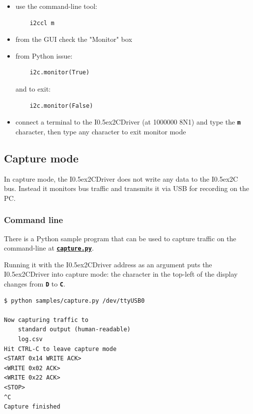 \documentclass{article}
\newcommand{\two}{\raise0.5ex\hbox{\footnotesize{2}}}
\newcommand{\iic}{I\two{}C}
\newcommand{\iicdriver}{I\two{}CDriver}
\newcommand{\mach}[1]{\texttt{\textbf{#1}}}
\begin{document}
\begin{itemize}
\item use the command-line tool:

\begin{lstlisting}
    i2ccl m
\end{lstlisting}

\item from the GUI check the "Monitor" box
\item from Python issue:

\begin{lstlisting}
    i2c.monitor(True)
\end{lstlisting}
  
and to exit:

\begin{lstlisting}
    i2c.monitor(False)
\end{lstlisting}

\item connect a terminal to the \iicdriver{} (at 1000000 8N1) and type the \mach{m} character, then type any character to exit monitor mode
\end{itemize}

\subsection{Capture mode}

In capture mode, the \iicdriver{} does not write any data to the \iic{} bus.
Instead it monitors bus traffic and transmits it via USB for recording on the PC.

\subsubsection{Command line}\index{capture.py@\mach{capture.py}}

There is a Python sample program that can be used to capture traffic on the command-line at
\href{https://github.com/jamesbowman/i2cdriver/blob/master/python/samples/capture.py}{\mach{capture.py}}.

Running it with the \iicdriver{} address as an argument puts the \iicdriver{} into capture mode:
the character in the top-left of the display changes from \mach{D} to \mach{C}.

\begin{lstlisting}
$ python samples/capture.py /dev/ttyUSB0

Now capturing traffic to
    standard output (human-readable)
    log.csv
Hit CTRL-C to leave capture mode
<START 0x14 WRITE ACK>
<WRITE 0x02 ACK>
<WRITE 0x22 ACK>
<STOP>
^C
Capture finished
\end{lstlisting}
\end{document}
